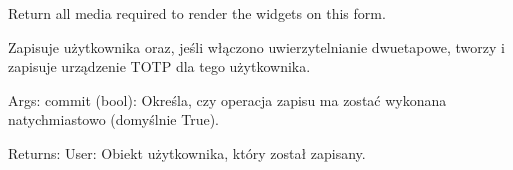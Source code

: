 \documentclass[letterpaper,11pt,polish]{sphinxmanual}
\begin{document}
\begin{fulllineitems}

\begin{fulllineitems}
\label{\detokenize{mainApp:mainApp.forms.UserForm.media}}
\pysigstartsignatures
{}
\pysigstopsignatures
\sphinxAtStartPar
Return all media required to render the widgets on this form.

\end{fulllineitems}


\begin{fulllineitems}
\label{\detokenize{mainApp:mainApp.forms.UserForm.save}}
\pysigstartsignatures
{}
\pysigstopsignatures
\sphinxAtStartPar
Zapisuje użytkownika oraz, jeśli włączono uwierzytelnianie dwuetapowe,
tworzy i zapisuje urządzenie TOTP dla tego użytkownika.

\sphinxAtStartPar
Args:
commit (bool): Określa, czy operacja zapisu ma zostać wykonana natychmiastowo (domyślnie True).

\sphinxAtStartPar
Returns:
User: Obiekt użytkownika, który został zapisany.

\end{fulllineitems}


\end{fulllineitems}
\end{document}
